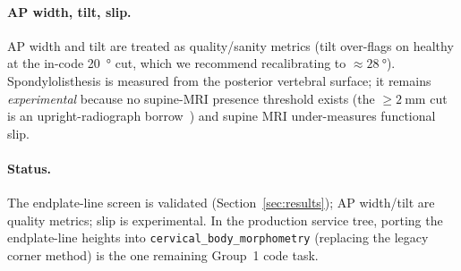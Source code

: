 \paragraph{AP width, tilt, slip.} AP width and tilt are treated as quality/sanity metrics (tilt over-flags
on healthy at the in-code \SI{20}{\degree} cut, which we recommend recalibrating to $\approx
\SI{28}{\degree}$). Spondylolisthesis is measured from the posterior vertebral surface; it remains
\emph{experimental} because no supine-MRI presence threshold exists (the $\geq\!\SI{2}{\milli\meter}$ cut
is an upright-radiograph borrow~\cite{murakami2020}) and supine MRI under-measures functional slip.

\paragraph{Status.} The endplate-line \hahp{} screen is validated (Section~\ref{sec:results}); AP
width/tilt are quality metrics; slip is experimental. In the production service tree, porting the
endplate-line heights into \texttt{cervical\_body\_morphometry} (replacing the legacy corner method) is
the one remaining Group~1 code task.

